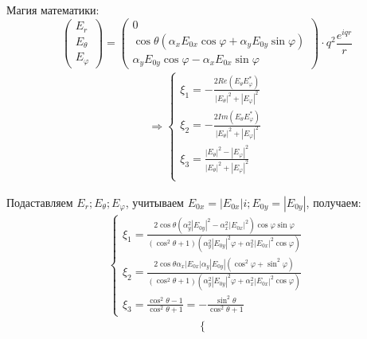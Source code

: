 \documentclass[12pt]{article}
\begin{document}
\begin{large}
\par Магия математики:
\begin{equation*}
    \begin{pmatrix}
        E_r \\
        E_\theta \\
        E_\varphi
    \end{pmatrix}
    =
    \begin{pmatrix}
        0 \\
        \cos \theta \left( \alpha_x E_{0x} \cos \varphi + \alpha_y E_{0y} \sin \varphi \right) \\
        \alpha_y E_{0y} \cos \varphi - \alpha_x E_{0x} \sin \varphi
    \end{pmatrix}
    \cdot q^2 \frac{e^{iqr}}{r}
\end{equation*}
\begin{eqnarray*}
\Rightarrow
    \begin{cases}
        \xi_1 = - \frac{2 Re\left( E_\theta E_\varphi^* \right)}{|E_\theta|^2 + |E_\varphi|^2} \\
        \xi_2 = - \frac{2 Im\left( E_\theta E_\varphi^* \right)}{|E_\theta|^2 + |E_\varphi|^2} \\
        \xi_3 = \frac{|E_\theta|^2 - |E_\varphi|^2}{|E_\theta|^2 + |E_\varphi|^2} \\
    \end{cases}
\end{eqnarray*}
\par Подаставляем $E_r; E_\theta; E_\varphi$, учитываем $E_{0x} = |E_{0x}| i ; E_{0y} = |E_{0y}|$, получаем:
\begin{eqnarray*}
    \begin{cases}
        \xi_1 = \frac{2 \cos \theta \left( \alpha_y^2 |E_{0y}|^2 - \alpha_x^2 |E_{0x}|^2 \right) \cos \varphi \sin \varphi}{\left( \cos^2 \theta + 1 \right)\left( \alpha_y^2 |E_{0y}|^2 \varphi + \alpha_x^2 |E_{0x}|^2 \cos \varphi \right)} \\
        \xi_2 = \frac{2 \cos \theta \alpha_x |E_{0x}| \alpha_y |E_{0y}| \left( \cos^2 \varphi + \sin^2 \varphi \right)}{\left( \cos^2 \theta + 1 \right)\left( \alpha_y^2 |E_{0y}|^2 \varphi + \alpha_x^2 |E_{0x}|^2 \cos \varphi \right)} \\
        \xi_3 = \frac{\cos^2 \theta - 1}{\cos^2 \theta + 1} = - \frac{\sin^2 \theta}{\cos^2 \theta + 1}
    \end{cases}
\end{eqnarray*}
\begin{eqnarray*}
    \begin{cases}

\end{cases}
\end{eqnarray*}
\end{large}
\end{document}

